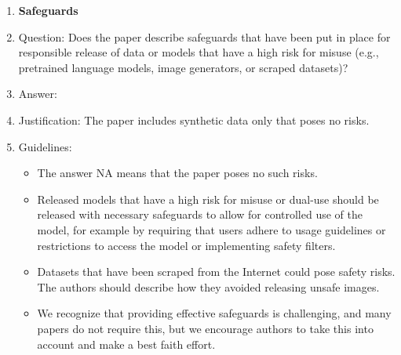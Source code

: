 \documentclass{article}
\begin{document}
\begin{enumerate}
\item {\bf Safeguards}
    \item[] Question: Does the paper describe safeguards that have been put in place for responsible release of data or models that have a high risk for misuse (e.g., pretrained language models, image generators, or scraped datasets)?
    \item[] Answer: \answerNA{} %
    \item[] Justification: The paper includes synthetic data only that poses no risks.
    \item[] Guidelines:
    \begin{itemize}
        \item The answer NA means that the paper poses no such risks.
        \item Released models that have a high risk for misuse or dual-use should be released with necessary safeguards to allow for controlled use of the model, for example by requiring that users adhere to usage guidelines or restrictions to access the model or implementing safety filters. 
        \item Datasets that have been scraped from the Internet could pose safety risks. The authors should describe how they avoided releasing unsafe images.
        \item We recognize that providing effective safeguards is challenging, and many papers do not require this, but we encourage authors to take this into account and make a best faith effort.
    \end{itemize}


\end{enumerate}
\end{document}
